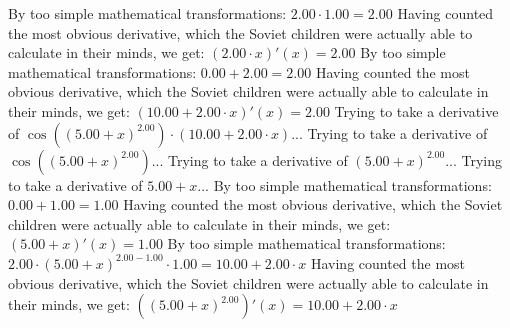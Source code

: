 \documentclass{article}
\begin{document}
By too simple mathematical transformations:
 ${{2.00} \cdot {1.00}} = {2.00}$ 
 \newline
 \newline 
Having counted the most obvious derivative, which the Soviet children were actually able to calculate in their minds, we get:
$({{2.00} \cdot {x}})'(x) = {2.00}$\newline
\newline
By too simple mathematical transformations:
 ${{0.00} + {2.00}} = {2.00}$ 
 \newline
 \newline 
Having counted the most obvious derivative, which the Soviet children were actually able to calculate in their minds, we get:
$({{10.00} + {{2.00} \cdot {x}}})'(x) = {2.00}$\newline
\newline
Trying to take a derivative of ${ \cos {\left({\left({{5.00} + {x}}\right) ^ {2.00}}\right)}  \cdot \left({{10.00} + {{2.00} \cdot {x}}}\right)}$...\newline
\newline
Trying to take a derivative of $ \cos {\left({\left({{5.00} + {x}}\right) ^ {2.00}}\right)} $...\newline
\newline
Trying to take a derivative of ${\left({{5.00} + {x}}\right) ^ {2.00}}$...\newline
\newline
Trying to take a derivative of ${{5.00} + {x}}$...\newline
\newline
By too simple mathematical transformations:
 ${{0.00} + {1.00}} = {1.00}$ 
 \newline
 \newline 
Having counted the most obvious derivative, which the Soviet children were actually able to calculate in their minds, we get:
$({{5.00} + {x}})'(x) = {1.00}$\newline
\newline
By too simple mathematical transformations:
 ${{{2.00} \cdot {\left({{5.00} + {x}}\right) ^ {{2.00} - {1.00}}}} \cdot {1.00}} = {{10.00} + {{2.00} \cdot {x}}}$ 
 \newline
 \newline 
Having counted the most obvious derivative, which the Soviet children were actually able to calculate in their minds, we get:
$({\left({{5.00} + {x}}\right) ^ {2.00}})'(x) = {{10.00} + {{2.00} \cdot {x}}}$\newline
\newline
\end{document}
